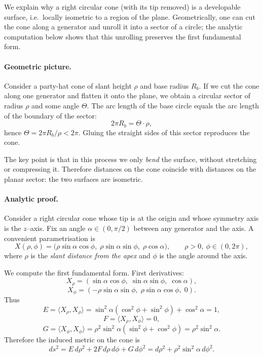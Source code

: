 \documentclass[12pt,a4paper]{article}
\theoremstyle{plain}
\theoremstyle{definition}      %
\begin{document}
	We explain why a right circular cone (with its tip removed) is a developable
	surface, i.e.\ locally isometric to a region of the plane.  Geometrically, one
	can cut the cone along a generator and unroll it into a sector of a circle; the
	analytic computation below shows that this unrolling preserves the first
	fundamental form.
	
	\paragraph{Geometric picture.}
	Consider a party-hat cone of slant height $\rho$ and base radius $R_b$.  If we
	cut the cone along one generator and flatten it onto the plane, we obtain a
	circular sector of radius $\rho$ and some angle $\Theta$.  The arc length of
	the base circle equals the arc length of the boundary of the sector:
	\[
	2\pi R_b = \Theta\cdot\rho,
	\]
	hence $\Theta = 2\pi R_b/\rho < 2\pi$.  Gluing the straight sides of this
	sector reproduces the cone.
	
	The key point is that in this process we only \emph{bend} the surface, without
	stretching or compressing it.  Therefore distances on the cone coincide with
	distances on the planar sector: the two surfaces are isometric.
	
	\paragraph{Analytic proof.}
	Consider a right circular cone whose tip is at the origin and whose symmetry
	axis is the $z$--axis.  Fix an angle $\alpha\in(0,\pi/2)$ between any generator
	and the axis.  A convenient parametrisation is
	\[
	X(\rho,\phi)
	= \bigl(\rho\sin\alpha\cos\phi,\;
	\rho\sin\alpha\sin\phi,\;
	\rho\cos\alpha\bigr),
	\qquad \rho>0,\ \phi\in(0,2\pi),
	\]
	where $\rho$ is the \emph{slant distance from the apex} and $\phi$ is the angle
	around the axis.
	
	We compute the first fundamental form.  First derivatives:
	\[
	X_\rho = (\sin\alpha\cos\phi,\;\sin\alpha\sin\phi,\;\cos\alpha),
	\]
	\[
	X_\phi = (-\rho\sin\alpha\sin\phi,\;\rho\sin\alpha\cos\phi,\;0).
	\]
	Thus
	\[
	E = \langle X_\rho,X_\rho\rangle
	= \sin^2\alpha(\cos^2\phi+\sin^2\phi)+\cos^2\alpha = 1,
	\]
	\[
	F = \langle X_\rho,X_\phi\rangle = 0,
	\]
	\[
	G = \langle X_\phi,X_\phi\rangle
	= \rho^2\sin^2\alpha(\sin^2\phi+\cos^2\phi)
	= \rho^2\sin^2\alpha.
	\]
	Therefore the induced metric on the cone is
	\[
	ds^2 = E\,d\rho^2 + 2F\,d\rho\,d\phi + G\,d\phi^2
	= d\rho^2 + \rho^2\sin^2\alpha\,d\phi^2.
	\]
	
\end{document}
